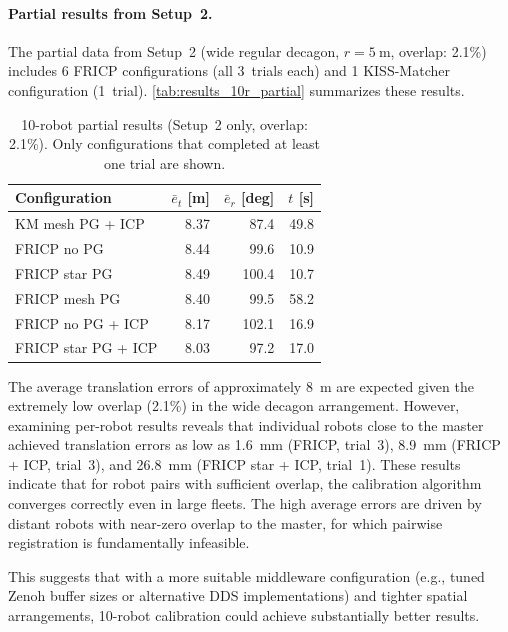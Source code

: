 \paragraph{Partial results from Setup~2.}
The partial data from Setup~2 (wide regular decagon,
$r = \SI{5}{\metre}$, overlap: 2.1\%) includes 6 FRICP
configurations (all 3~trials each) and 1 KISS-Matcher configuration
(1~trial).
\autoref{tab:results_10r_partial} summarizes these results.

\begin{table}[htbp]
    \centering
    \caption{10-robot partial results (Setup~2 only, overlap: 2.1\%).
             Only configurations that completed at least one trial
             are shown.}
    \label{tab:results_10r_partial}
    \small
    \begin{tabular}{l r r r}
        \toprule
        \textbf{Configuration}
            & $\bar{e}_t$ [m]
            & $\bar{e}_r$ [deg]
            & $t$ [s] \\
        \midrule
        KM mesh PG + ICP   & 8.37  & 87.4  & 49.8 \\
        \midrule
        FRICP no PG        & 8.44  & 99.6  & 10.9 \\
        FRICP star PG      & 8.49  & 100.4 & 10.7 \\
        FRICP mesh PG      & 8.40  & 99.5  & 58.2 \\
        FRICP no PG + ICP  & 8.17  & 102.1 & 16.9 \\
        FRICP star PG + ICP & 8.03  & 97.2  & 17.0 \\
        \bottomrule
    \end{tabular}
\end{table}

The average translation errors of approximately \SI{8}{\metre} are
expected given the extremely low overlap (2.1\%) in the wide decagon
arrangement.
However, examining per-robot results reveals that individual robots
close to the master achieved translation errors as low as
\SI{1.6}{\milli\metre} (FRICP, trial~3), \SI{8.9}{\milli\metre}
(FRICP + ICP, trial~3), and \SI{26.8}{\milli\metre}
(FRICP star + ICP, trial~1).
These results indicate that for robot pairs with sufficient overlap,
the calibration algorithm converges correctly even in large fleets.
The high average errors are driven by distant robots with near-zero
overlap to the master, for which pairwise registration is
fundamentally infeasible.

This suggests that with a more suitable middleware configuration
(e.g., tuned Zenoh buffer sizes or alternative DDS implementations)
and tighter spatial arrangements, 10-robot calibration could achieve
substantially better results.

